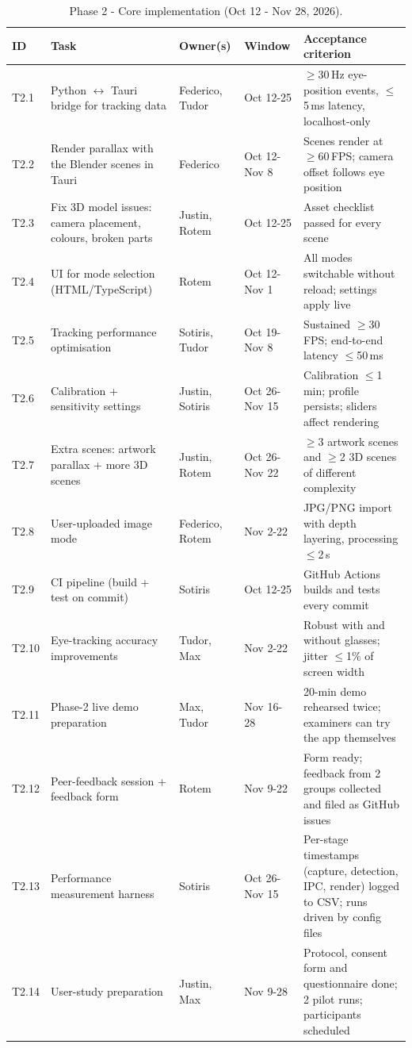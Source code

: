 \documentclass[11pt,a4paper]{article}
\begin{document}
\begin{table}[H]
\centering
\caption{Phase 2 - Core implementation (Oct 12 - Nov 28, 2026).}
\label{tab:p2}
\footnotesize
\renewcommand{\arraystretch}{1.05}
\begin{tabularx}{\textwidth}{@{}l >{\raggedright\arraybackslash}p{38mm} >{\raggedright\arraybackslash}p{21mm} >{\raggedright\arraybackslash}p{20mm} L@{}}
\toprule
\textbf{ID} & \textbf{Task} & \textbf{Owner(s)} & \textbf{Window} & \textbf{Acceptance criterion} \\
\midrule
T2.1 & Python $\leftrightarrow$ Tauri bridge for tracking data & Federico, Tudor & Oct 12-25 & $\geq$30\,Hz eye-position events, $\leq$5\,ms latency, localhost-only \\
T2.2 & Render parallax with the Blender scenes in Tauri & Federico & Oct 12-Nov 8 & Scenes render at $\geq$60\,FPS; camera offset follows eye position \\
T2.3 & Fix 3D model issues: camera placement, colours, broken parts & Justin, Rotem & Oct 12-25 & Asset checklist passed for every scene \\
T2.4 & UI for mode selection (HTML/TypeScript) & Rotem & Oct 12-Nov 1 & All modes switchable without reload; settings apply live \\
T2.5 & Tracking performance optimisation & Sotiris, Tudor & Oct 19-Nov 8 & Sustained $\geq$30\,FPS; end-to-end latency $\leq$50\,ms \\
T2.6 & Calibration + sensitivity settings & Justin, Sotiris & Oct 26-Nov 15 & Calibration $\leq$1\,min; profile persists; sliders affect rendering \\
T2.7 & Extra scenes: artwork parallax + more 3D scenes & Justin, Rotem & Oct 26-Nov 22 & $\geq$3 artwork scenes and $\geq$2 3D scenes of different complexity \\
T2.8 & User-uploaded image mode & Federico, Rotem & Nov 2-22 & JPG/PNG import with depth layering, processing $\leq$2\,s \\
T2.9 & CI pipeline (build + test on commit) & Sotiris & Oct 12-25 & GitHub Actions builds and tests every commit \\
T2.10 & Eye-tracking accuracy improvements & Tudor, Max & Nov 2-22 & Robust with and without glasses; jitter $\leq$1\% of screen width \\
T2.11 & Phase-2 live demo preparation & Max, Tudor & Nov 16-28 & 20-min demo rehearsed twice; examiners can try the app themselves \\
T2.12 & Peer-feedback session + feedback form & Rotem & Nov 9-22 & Form ready; feedback from 2 groups collected and filed as GitHub issues \\
T2.13 & Performance measurement harness & Sotiris & Oct 26-Nov 15 & Per-stage timestamps (capture, detection, IPC, render) logged to CSV; runs driven by config files \\
T2.14 & User-study preparation & Justin, Max & Nov 9-28 & Protocol, consent form and questionnaire done; 2 pilot runs; participants scheduled \\
\bottomrule
\end{tabularx}
\end{table}
\end{document}
